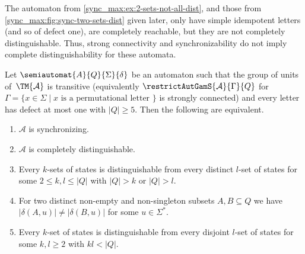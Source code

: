 \begin{remark}
	The automaton from \cref{sync_max:ex:2-sets-not-all-dist},
	and those from \cref{sync_max:fig:sync-two-sets-dist}
	given later, only have simple idempotent letters (and so of defect one),
	are completely reachable, but they are not completely distinguishable.
	Thus, strong connectivity and synchronizability
	do not imply complete distinguishability for these automata.
\end{remark}


\begin{corollary} \label{cor:defectatmostone-weaker}
	Let $\semiautomat{A}{Q}{\Sigma}{\delta}$
	be an automaton such that the group of units of~$\TM{\mathcal A}$
	is transitive (equivalently $\restrictAutGamS{\mathcal A}{\Gamma}{Q}$
	for $\Gamma = \{ x \in \Sigma \mid \text{$x$ is a permutational letter } \}$ is strongly connected) and every letter has defect at most one with $|Q| \ge 5$.
	Then the following are equivalent.
	\begin{enumerate}
	\item \label{defone:item:sync} $\mathcal A$ is synchronizing.
	
	\item \label{defone:item:cd} $\mathcal A$ is completely distinguishable.
	
	\item \label{defone:item:k-sets} 	
	Every $k$-sets of states is distinguishable from every distinct $l$-set of states for some $2 \le k, l \le |Q|$ with $|Q| > k$ or $|Q| > l$.
		
	\item \label{defone:item:dist-card} For two distinct non-empty and non-singleton subsets $A, B \subseteq Q$
	we have $|\delta(A, u)| \ne |\delta(B, u)|$ for some $u \in \Sigma^*$.		
	
	\item \label{defone:item:disjoint-kl-sets} 
	Every $k$-set of states is distinguishable from every disjoint $l$-set
	of states for some $k, l \ge 2$ with $kl < |Q|$.
	\end{enumerate}
\end{corollary}
